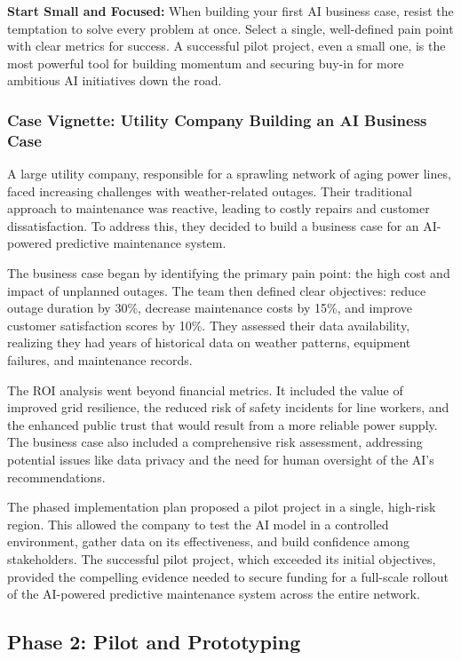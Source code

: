 \begin{tipbox}
\textbf{Start Small and Focused:} When building your first AI business case, resist the temptation to solve every problem at once. Select a single, well-defined pain point with clear metrics for success. A successful pilot project, even a small one, is the most powerful tool for building momentum and securing buy-in for more ambitious AI initiatives down the road.
\end{tipbox}

\subsubsection{Case Vignette: Utility Company Building an AI Business Case}
A large utility company, responsible for a sprawling network of aging power lines, faced increasing challenges with weather-related outages. Their traditional approach to maintenance was reactive, leading to costly repairs and customer dissatisfaction. To address this, they decided to build a business case for an AI-powered predictive maintenance system.

The business case began by identifying the primary pain point: the high cost and impact of unplanned outages. The team then defined clear objectives: reduce outage duration by 30\%, decrease maintenance costs by 15\%, and improve customer satisfaction scores by 10\%. They assessed their data availability, realizing they had years of historical data on weather patterns, equipment failures, and maintenance records.

The ROI analysis went beyond financial metrics. It included the value of improved grid resilience, the reduced risk of safety incidents for line workers, and the enhanced public trust that would result from a more reliable power supply. The business case also included a comprehensive risk assessment, addressing potential issues like data privacy and the need for human oversight of the AI's recommendations.

The phased implementation plan proposed a pilot project in a single, high-risk region. This allowed the company to test the AI model in a controlled environment, gather data on its effectiveness, and build confidence among stakeholders. The successful pilot project, which exceeded its initial objectives, provided the compelling evidence needed to secure funding for a full-scale rollout of the AI-powered predictive maintenance system across the entire network.

\subsection{Phase 2: Pilot and Prototyping}

